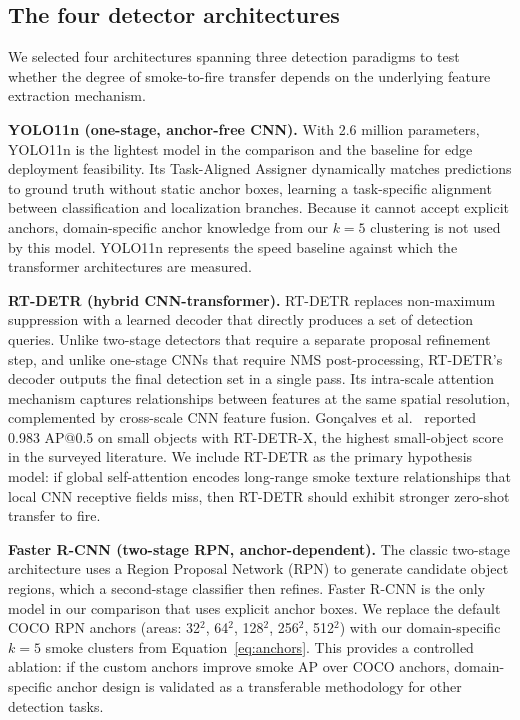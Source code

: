 \documentclass[10pt,twocolumn]{article}
\begin{document}
\subsection{The four detector architectures}

We selected four architectures spanning three detection paradigms to test whether the degree of smoke-to-fire transfer depends on the underlying feature extraction mechanism.

\textbf{YOLO11n (one-stage, anchor-free CNN).} With 2.6 million parameters, YOLO11n is the lightest model in the comparison and the baseline for edge deployment feasibility. Its Task-Aligned Assigner dynamically matches predictions to ground truth without static anchor boxes, learning a task-specific alignment between classification and localization branches. Because it cannot accept explicit anchors, domain-specific anchor knowledge from our \(k=5\) clustering is not used by this model. YOLO11n represents the speed baseline against which the transformer architectures are measured.

\textbf{RT-DETR (hybrid CNN-transformer).} RT-DETR replaces non-maximum suppression with a learned decoder that directly produces a set of detection queries. Unlike two-stage detectors that require a separate proposal refinement step, and unlike one-stage CNNs that require NMS post-processing, RT-DETR's decoder outputs the final detection set in a single pass. Its intra-scale attention mechanism captures relationships between features at the same spatial resolution, complemented by cross-scale CNN feature fusion. Gon{\c{c}}alves et al.~\cite{goncalves2024wildfire} reported 0.983 AP@0.5 on small objects with RT-DETR-X, the highest small-object score in the surveyed literature. We include RT-DETR as the primary hypothesis model: if global self-attention encodes long-range smoke texture relationships that local CNN receptive fields miss, then RT-DETR should exhibit stronger zero-shot transfer to fire.

\textbf{Faster R-CNN (two-stage RPN, anchor-dependent).} The classic two-stage architecture uses a Region Proposal Network (RPN) to generate candidate object regions, which a second-stage classifier then refines. Faster R-CNN is the only model in our comparison that uses explicit anchor boxes. We replace the default COCO RPN anchors (areas: 32\(^2\), 64\(^2\), 128\(^2\), 256\(^2\), 512\(^2\)) with our domain-specific \(k=5\) smoke clusters from Equation~\ref{eq:anchors}. This provides a controlled ablation: if the custom anchors improve smoke AP over COCO anchors, domain-specific anchor design is validated as a transferable methodology for other detection tasks.
\end{document}
